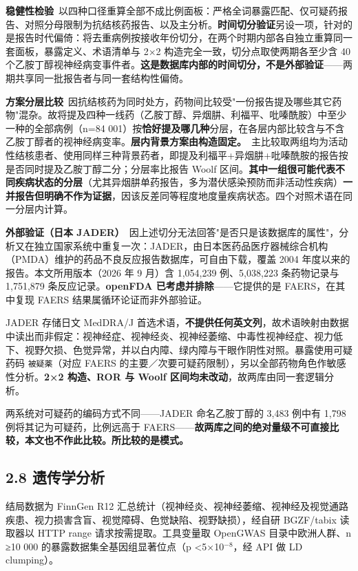 \documentclass[UTF8,fontset=windows,11pt]{ctexart}
\begin{document}
\textbf{稳健性检验}\ 以四种口径重算全部不成比例面板：严格全词暴露匹配、仅可疑药报告、对照分母限制为抗结核药报告、以及主分析。\textbf{时间切分验证}另设一项，针对的是报告时代偏倚：将去重病例按接收年份切分，在两个时期内部各自独立重算同一套面板，暴露定义、术语清单与 2×2 构造完全一致，切分点取使两期各至少含 40 个乙胺丁醇视神经病变事件者。\textbf{这是数据库内部的时间切分，不是外部验证}——两期共享同一批报告者与同一套结构性偏倚。

\textbf{方案分层比较}\ 因抗结核药为同时处方，药物间比较受"一份报告提及哪些其它药物"混杂。故将提及四种一线药（乙胺丁醇、异烟肼、利福平、吡嗪酰胺）中至少一种的全部病例（n=84 001）按\textbf{恰好提及哪几种}分层，在各层内部比较含与不含乙胺丁醇者的视神经病变率。\textbf{层内背景方案由构造固定。}\ 主比较取两组均为活动性结核患者、使用同样三种背景药者，即提及利福平+异烟肼+吡嗪酰胺的报告按是否同时提及乙胺丁醇二分；分层率比报告 Woolf 区间。\textbf{其中一组很可能代表不同疾病状态的分层}（尤其异烟肼单药报告，多为潜伏感染预防而非活动性疾病）\textbf{一并报告但明确不作为证据}，因该反差同等程度地度量疾病状态。四个对照术语在同一分层内计算。

\textbf{外部验证（日本 JADER）}\ 因上述切分无法回答"是否只是该数据库的属性"，分析又在独立国家系统中重复一次：JADER，由日本医药品医疗器械综合机构（PMDA）维护的药品不良反应报告数据库，可自由下载，覆盖 2004 年度以来的报告。本文所用版本（2026 年 9 月）含 1,054,239 例、5,038,223 条药物记录与 1,751,879 条反应记录。\textbf{openFDA 已考虑并排除}——它提供的是 FAERS，在其中复现 FAERS 结果属循环论证而非外部验证。

JADER 存储日文 MedDRA/J 首选术语，\textbf{不提供任何英文列}，故术语映射由数据中读出而非假定：视神经症、视神经炎、视神经萎缩、中毒性视神经症、视力低下、视野欠损、色觉异常，并以白内障、绿内障与干眼作阴性对照。暴露使用可疑药码 \texttt{被疑薬}（对应 FAERS 的主要／次要可疑药限制），另以全部药物角色作敏感性分析。\textbf{2×2 构造、ROR 与 Woolf 区间均未改动}，故两库由同一套逻辑分析。

两系统对可疑药的编码方式不同——JADER 命名乙胺丁醇的 3,483 例中有 1,798 例将其记为可疑药，比例远高于 FAERS——\textbf{故两库之间的绝对量级不可直接比较，本文也不作此比较。所比较的是模式。}

\subsection{2.8 遗传学分析}

结局数据为 FinnGen R12 汇总统计（视神经炎、视神经萎缩、视神经及视觉通路疾患、视力损害含盲、视觉障碍、色觉缺陷、视野缺损），经自研 BGZF/tabix 读取器以 HTTP range 请求按需提取。工具变量取 OpenGWAS 目录中欧洲人群、n ≥10 000 的暴露数据集全基因组显著位点（p <5×10$^{-8}$，经 API 做 LD clumping）。
\end{document}
